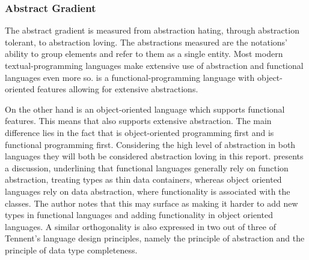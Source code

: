\subsubsection{Abstract Gradient}
The abstract gradient is measured from abstraction hating, through abstraction tolerant, to abstraction loving. The abstractions measured are the notations' ability to group elements and refer to them as a single entity. Most modern textual-programming languages make extensive use of abstraction and functional languages even more so\cite{hudak1989conception}. \fs is a functional-programming language with object-oriented features allowing for extensive abstractions.

On the other hand \cs is an object-oriented language which supports functional features. This means that \cs also supports extensive abstraction. The main difference lies in the fact that \cs is object-oriented programming first and \fs is functional programming first. %
Considering the high level of abstraction in both languages they will both be considered abstraction loving in this report. \cite{bendersky:abstraction} presents a discussion, underlining that functional languages generally rely on function abstraction, treating types as thin data containers, whereas object oriented languages rely on data abstraction, where functionality is associated with the classes. The author notes that this may surface as making it harder to add new types in functional languages and adding functionality in object oriented languages. A similar orthogonality is also expressed in two out of three of Tennent's language design principles\cite{tennent1977language}, namely the principle of abstraction and the principle of data type completeness.